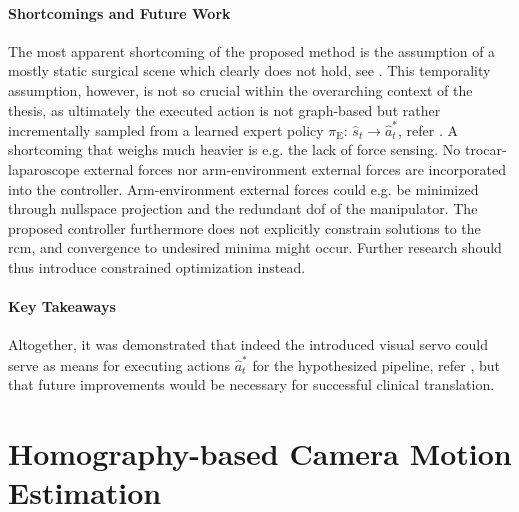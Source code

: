 \paragraph{Shortcomings and Future Work} The most apparent shortcoming of the proposed method is the assumption of a mostly static surgical scene which clearly does not hold, see . This temporality assumption, however, is not so crucial within the overarching context of the thesis, as ultimately the executed action is not graph-based but rather incrementally sampled from a learned expert policy $\pi_\text{E}:\, \hat{s}_t \rightarrow \hat{a}^*_t$, refer . A shortcoming that weighs much heavier is e.g. the lack of force sensing. No trocar-laparoscope external forces nor arm-environment external forces are incorporated into the controller. Arm-environment external forces could e.g. be minimized through nullspace projection and the redundant \gls{dof} of the manipulator. The proposed controller furthermore does not explicitly constrain solutions to the \gls{rcm}, and convergence to undesired minima might occur. Further research should thus introduce constrained optimization instead.

\paragraph{Key Takeaways} Altogether, it was demonstrated that indeed the introduced visual servo could serve as means for executing actions $\hat{a}^*_t$ for the hypothesized pipeline, refer , but that future improvements would be necessary for successful clinical translation.

\section{Homography-based Camera Motion Estimation}
\label{con:sec:hom_est}
